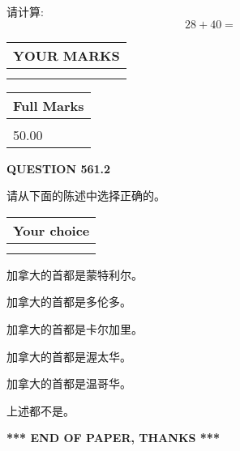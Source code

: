 \documentclass{ctexart}
\begin{document}
  
 
请计算:
\begin{equation}
28 +  %
40 = \nonumber
\end{equation}
 

 

 
  
\vspace{0.2in}
  
\noindent\begin{tabular}{|l|}
\hline
 YOUR MARKS  \\
\hline
 \\ 
 \\ 
\hline
\end{tabular}
\hspace{0.05in} \begin{tabular}{|l|}
\hline
 Full Marks  \\
\hline
 \\ 
50.00 \\
\hline
\end{tabular}
{\textbf{\Large{QUESTION
561.2 
}}}
  
  
请从下面的陈述中选择正确的。
  
  
\noindent\hspace{3.0in} \begin{tabular}{|l|}
\hline
Your choice \\
\hline
 \\ 
 \\ 
\hline
\end{tabular}
  
  
 
 
加拿大的首都是蒙特利尔。
 
 
加拿大的首都是多伦多。
 
 
加拿大的首都是卡尔加里。
 
 
加拿大的首都是渥太华。
 
 
加拿大的首都是温哥华。
 
 
 上述都不是。
 
 
   
   
 \vspace{0.2in}
 
   
   
   
   
\vspace{1.0in} 
{\textbf{\large{ *** END OF PAPER, THANKS *** }}} 
   
\end{document}
